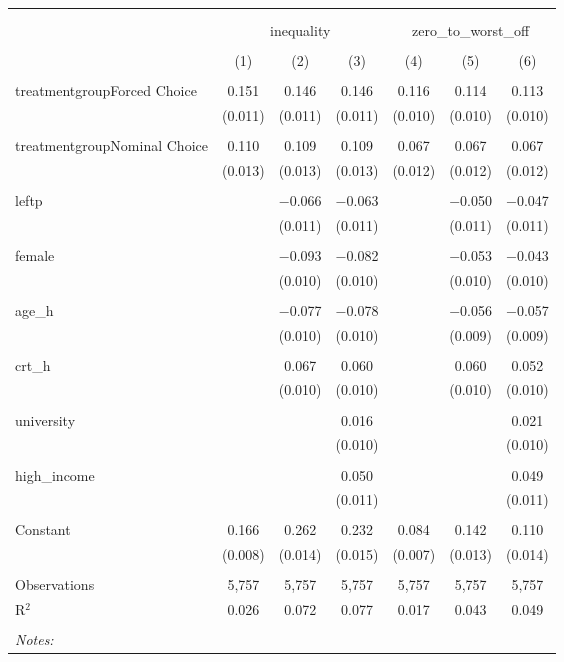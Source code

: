 
\begin{table}[!htbp] \centering 
  \caption{} 
  \label{} 
\begin{tabular}{@{\extracolsep{5pt}}lcccccc} 
\\[-1.8ex]\hline 
\hline \\[-1.8ex] 
\\[-1.8ex] & \multicolumn{3}{c}{inequality} & \multicolumn{3}{c}{zero\_to\_worst\_off} \\ 
\\[-1.8ex] & (1) & (2) & (3) & (4) & (5) & (6)\\ 
\hline \\[-1.8ex] 
 treatmentgroupForced Choice & 0.151 & 0.146 & 0.146 & 0.116 & 0.114 & 0.113 \\ 
  & (0.011) & (0.011) & (0.011) & (0.010) & (0.010) & (0.010) \\ 
  & & & & & & \\ 
 treatmentgroupNominal Choice & 0.110 & 0.109 & 0.109 & 0.067 & 0.067 & 0.067 \\ 
  & (0.013) & (0.013) & (0.013) & (0.012) & (0.012) & (0.012) \\ 
  & & & & & & \\ 
 leftp &  & $-$0.066 & $-$0.063 &  & $-$0.050 & $-$0.047 \\ 
  &  & (0.011) & (0.011) &  & (0.011) & (0.011) \\ 
  & & & & & & \\ 
 female &  & $-$0.093 & $-$0.082 &  & $-$0.053 & $-$0.043 \\ 
  &  & (0.010) & (0.010) &  & (0.010) & (0.010) \\ 
  & & & & & & \\ 
 age\_h &  & $-$0.077 & $-$0.078 &  & $-$0.056 & $-$0.057 \\ 
  &  & (0.010) & (0.010) &  & (0.009) & (0.009) \\ 
  & & & & & & \\ 
 crt\_h &  & 0.067 & 0.060 &  & 0.060 & 0.052 \\ 
  &  & (0.010) & (0.010) &  & (0.010) & (0.010) \\ 
  & & & & & & \\ 
 university &  &  & 0.016 &  &  & 0.021 \\ 
  &  &  & (0.010) &  &  & (0.010) \\ 
  & & & & & & \\ 
 high\_income &  &  & 0.050 &  &  & 0.049 \\ 
  &  &  & (0.011) &  &  & (0.011) \\ 
  & & & & & & \\ 
 Constant & 0.166 & 0.262 & 0.232 & 0.084 & 0.142 & 0.110 \\ 
  & (0.008) & (0.014) & (0.015) & (0.007) & (0.013) & (0.014) \\ 
  & & & & & & \\ 
Observations & 5,757 & 5,757 & 5,757 & 5,757 & 5,757 & 5,757 \\ 
R$^{2}$ & 0.026 & 0.072 & 0.077 & 0.017 & 0.043 & 0.049 \\ 
\hline \\[-1.8ex] 
\textit{Notes:} & \multicolumn{6}{l}{} \\ 
\end{tabular} 
\end{table} 
